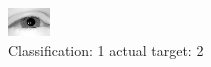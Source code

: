 \begin{figure}[h!]
\begin{center}
\includegraphics[width=0.60\columnwidth]{figures/ID2241_class_1_target_2.png}
\end{center}
\caption{ Classification: 1 actual target: 2}
\label{fig:ID2241_class_1_target_2}
\end{figure}
